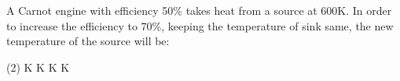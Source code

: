 \item A Carnot engine with efficiency 50\% takes heat from a source at 600K. In order to increase the efficiency to 70\%, keeping the temperature of sink same, the new temperature of the source will be:
    \begin{tasks}(2)
         K
         K
         K
         K
    \end{tasks}